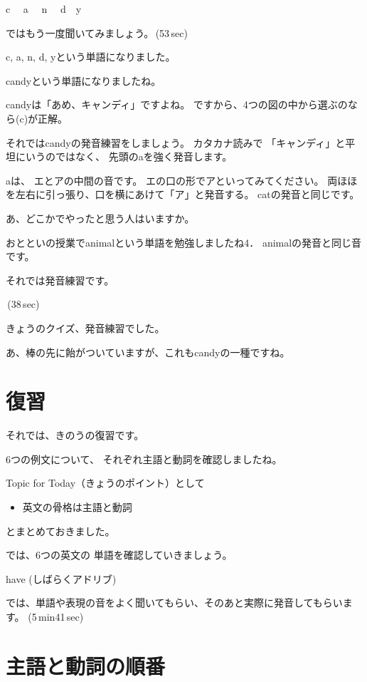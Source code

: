 \documentclass[book,jafontscale=0.9247]{jlreq}
\begin{document}
c\,\,
{\large \ComputerMouse}\,\,
a\,\,
{\large \ComputerMouse}\,\,
n\,\,
{\large \ComputerMouse}\,\,
d
{\large \ComputerMouse}\,\,
y

ではもう一度聞いてみましょう。\faVolumeUp\,(53\,sec)


c, a, n, d, yという単語になりました。

candyという単語になりましたね。

candyは「あめ、キャンディ」ですよね。
ですから、4つの図の中から選ぶのなら(c)が正解。

それではcandyの発音練習をしましょう。
カタカナ読みで
「キャンディ」と平坦にいうのではなく、
先頭のaを強く発音します。

aは、
エとアの中間の音です。
エの口の形でアといってみてください。
両ほほを左右に引っ張り、口を横にあけて「ア」と発音する。
catの発音と同じです。

あ、どこかでやったと思う人はいますか。

おとといの授業でanimalという単語を勉強しましたね4．
animalの発音と同じ音です。

それでは発音練習です。

\faVolumeUp\,(38\,sec)

きょうのクイズ、発音練習でした。

{\large \ComputerMouse}


あ、棒の先に飴がついていますが、これもcandyの一種ですね。

{\large \ComputerMouse}

\section{復習}


それでは、きのうの復習です。

6つの例文について、
それぞれ主語と動詞を確認しましたね。

Topic for Today（きょうのポイント）として
\begin{itemize}
 \item 英文の骨格は主語と動詞
\end{itemize}
とまとめておきました。

では、6つの英文の
単語を確認していきましょう。

have
(しばらくアドリブ)

では、単語や表現の音をよく聞いてもらい、そのあと実際に発音してもらいます。
(5\,min41\,sec)


\section{主語と動詞の順番}
\end{document}
